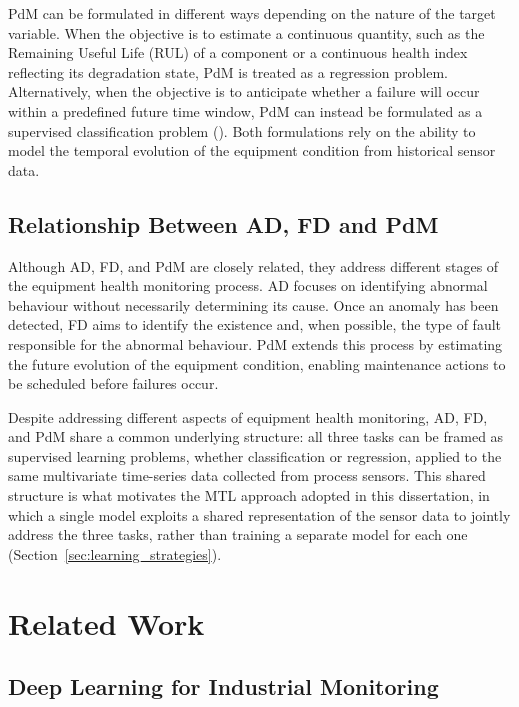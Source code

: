 PdM can be formulated in different ways depending on the nature of the target variable. When the objective is to estimate a continuous quantity, such as the 
Remaining Useful Life (RUL) of a component or a continuous health index reflecting its degradation state, PdM is treated as a regression problem. Alternatively, 
when the objective is to anticipate whether a failure will occur within a predefined future time window, PdM can instead be formulated as a supervised 
classification problem (\cite{Carvalho2019,Khan2026}). Both formulations rely on the ability to model the temporal evolution of the equipment condition from historical 
sensor data.

\subsection{Relationship Between AD, FD and PdM} \label{sec:relationship}

Although AD, FD, and PdM are closely related, they address different stages of the equipment health monitoring 
process. AD focuses on identifying abnormal behaviour without necessarily determining its cause. Once an anomaly has been detected, FD 
aims to identify the existence and, when possible, the type of fault responsible for the abnormal behaviour. PdM extends this process by 
estimating the future evolution of the equipment condition, enabling maintenance actions to be scheduled before failures occur.

Despite addressing different aspects of equipment health monitoring, AD, FD, and PdM share a common underlying structure: all three tasks can be framed as 
supervised learning problems, whether classification or regression, applied to the same multivariate time-series data collected from process sensors. This 
shared structure is what motivates the MTL approach adopted in this dissertation, in which a single model exploits a shared representation of 
the sensor data to jointly address the three tasks, rather than training a separate model for each one (Section~\ref{sec:learning_strategies}).

\section{Related Work}

\subsection{Deep Learning for Industrial Monitoring}

